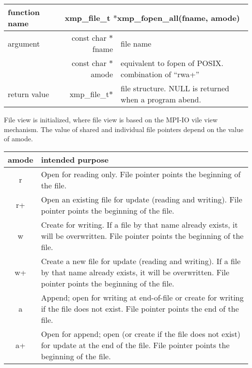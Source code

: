   \begin{table}[h]
    \begin{center}
      \begin{tabular}{|l|r|p{90mm}|}
      \hline
      {\bf function name}  & \multicolumn{2}{c|}{\bf xmp\_file\_t
      $*$xmp\_fopen\_all(fname, amode)}  \\ \hline \hline
      argument & const char $*$fname & file name \\ \cline{2-3}
      & const char $*$amode & equivalent to fopen of POSIX. combination
	      of ``rwa+'' \\ \hline
      return value & xmp\_file\_t$*$ & file structure. NULL is returned
	      when a program abend. \\ \hline
      \end{tabular}
     \end{center}
    \label{tb:aaa}
   \end{table}

   File view is initialized, where file view is based on the MPI-IO vile view mechanism. The value of shared and individual file pointers depend on the value of amode.

   \begin{table}[h]
     \begin{center}
    \label{tb:xxx}
    \begin{tabular}{|c|p{120mm}|}
      \hline
     amode & intended purpose \\ \hline \hline
     r &  Open for reading only. File pointer points the beginning of
	 the file.\\ \hline
     r+ & Open an existing file for update (reading and writing). File
	 pointer points the beginning of the file. \\ \hline
     w &  Create for writing. If a file by that name already exists, it
	 will be overwritten. File pointer points the beginning of the file. \\ \hline
     w+ & Create a new file for update (reading and writing). If a file
	 by that name already exists, it will be overwritten. File
	 pointer points the beginning of the file. \\ \hline
     a & Append; open for writing at end-of-file or create for writing
	 if the file does not exist. File pointer points the end of the file. \\ \hline
     a+ & Open for append; open (or create if the file does not exist)
	 for update at the end of the file. File pointer points the
	 beginning of the file. \\ \hline
    \end{tabular}
   \end{center}
   \end{table}

